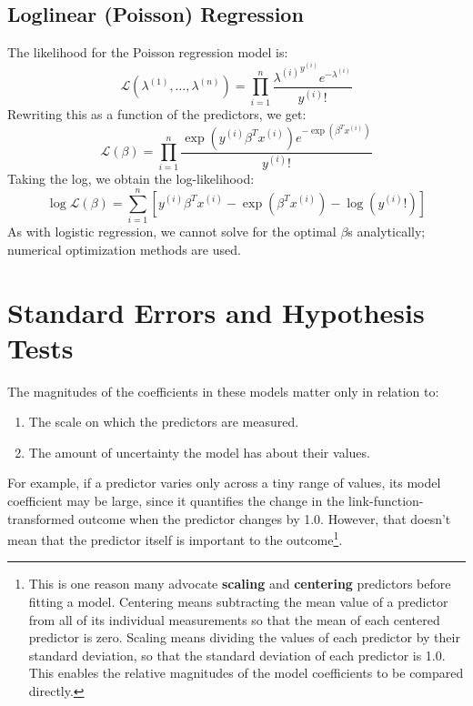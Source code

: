 \subsection{Loglinear (Poisson) Regression}

The likelihood for the Poisson regression model is:
$$ \mathcal{L}(\lambda^{(1)}, \dots, \lambda^{(n)}) = \prod_{i=1}^n \frac{{\lambda^{(i)}}^{y^{(i)}} e^{-\lambda^{(i)}}}{y^{(i)}!} $$
Rewriting this as a function of the predictors, we get:
$$ \mathcal{L}(\beta) = \prod_{i=1}^n \frac{\exp{(y^{(i)} \beta^T x^{(i)})} e^{-\exp{(\beta^T x^{(i)})}}}{y^{(i)}!} $$
Taking the log, we obtain the log-likelihood:
$$ \log \mathcal{L}(\beta) = \sum_{i=1}^n \left[ y^{(i)} \beta^T x^{(i)} - \exp(\beta^T x^{(i)}) - \log (y^{(i)}!) \right] $$
As with logistic regression, we cannot solve for the optimal $\beta$s analytically; numerical optimization methods are used. 


\section{Standard Errors and Hypothesis Tests \label{section:sehyp}}

The magnitudes of the coefficients in these models matter only in relation to:
\begin{enumerate}
\item The scale on which the predictors are measured. 
\item The amount of uncertainty the model has about their values.
\end{enumerate}
For example, if a predictor varies only across a tiny range of values, its model coefficient may be large, since it quantifies the change in the link-function-transformed outcome when the predictor changes by 1.0. However, that doesn't mean that the predictor itself is important to the outcome\footnote{This is one reason many advocate \textbf{scaling} and \textbf{centering} predictors before fitting a model. Centering means subtracting the mean value of a predictor from all of its individual measurements so that the mean of each centered predictor is zero. Scaling means dividing the values of each predictor by their standard deviation, so that the standard deviation of each predictor is 1.0. This enables the relative magnitudes of the model coefficients to be compared directly.}.

